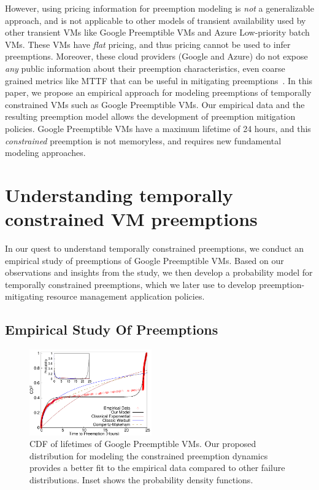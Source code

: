 \documentclass[sigconf]{acmart} %
\newcommand{\subsecspace}[0]{-0.20cm}
\begin{document}
However, using pricing information for preemption modeling is \emph{not} a generalizable approach, and is not applicable to other models of transient availability used by other transient VMs like Google Preemptible VMs and Azure Low-priority batch VMs. 
These VMs have \emph{flat} pricing, and thus pricing cannot be used to infer preemptions. 
Moreover, these cloud providers (Google and Azure) do not expose \emph{any} public information about their preemption characteristics, even coarse grained metrics like MTTF that can be useful in mitigating preemptions~\cite{chien-ic2e19}. 
In this paper, we propose an empirical approach for modeling preemptions of temporally constrained VMs such as Google Preemptible VMs.
Our empirical data and the resulting preemption model allows the development of preemption mitigation policies. 
Google Preemptible VMs have a maximum lifetime of 24 hours, and this \emph{constrained} preemption is not memoryless, and requires new fundamental modeling approaches. 

\section{Understanding temporally constrained VM preemptions}
\label{sec:failmodel}

In our quest to understand temporally constrained preemptions, we  conduct an empirical study of preemptions of Google Preemptible VMs.
Based on our observations and insights from the study, we then develop a probability model for temporally constrained preemptions, which we later use to develop preemption-mitigating resource management application policies. 

\vspace*{\subsecspace}
\subsection{Empirical Study Of Preemptions}\label{sec:empirical}

\begin{figure}
  \includegraphics[width=0.47\textwidth]{sigmetrics-fig-cdf-prob-inset-time.pdf} 
  \caption{CDF of lifetimes of Google Preemptible VMs. Our proposed distribution for modeling the constrained preemption dynamics provides a better fit to the empirical data compared to other failure distributions. Inset shows the probability density functions.}
  \label{fig:gcp1}
\end{figure}
\end{document}
